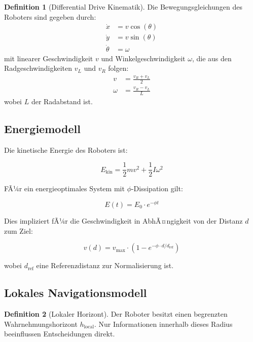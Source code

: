﻿\documentclass[a4paper,12pt]{article}
\theoremstyle{definition}
\newtheorem{definition}{Definition}
\begin{document}
\begin{definition}[Differential Drive Kinematik]
	Die Bewegungsgleichungen des Roboters sind gegeben durch:
	\begin{align}
		\dot{x} &= v \cos(\theta) \\
		\dot{y} &= v \sin(\theta) \\
		\dot{\theta} &= \omega
	\end{align}
	mit linearer Geschwindigkeit $v$ und Winkelgeschwindigkeit $\omega$, die aus den Radgeschwindigkeiten $v_L$ und $v_R$ folgen:
	\begin{align}
		v &= \frac{v_R + v_L}{2} \\
		\omega &= \frac{v_R - v_L}{L}
	\end{align}
	wobei $L$ der Radabstand ist.
\end{definition}

\subsection{Energiemodell}

Die kinetische Energie des Roboters ist:

\begin{equation}
E_{\text{kin}} = \frac{1}{2}m v^2 + \frac{1}{2}I \omega^2
\end{equation}

FÃ¼r ein energieoptimales System mit $\phi$-Dissipation gilt:

\begin{equation}
E(t) = E_0 \cdot e^{-\phi t}
\end{equation}

Dies impliziert fÃ¼r die Geschwindigkeit in AbhÃ¤ngigkeit von der Distanz $d$ zum Ziel:

\begin{equation}\label{eq:phi_speed}
v(d) = v_{\max} \cdot \left(1 - e^{-\phi \cdot d / d_{\text{ref}}}\right)
\end{equation}

wobei $d_{\text{ref}}$ eine Referenzdistanz zur Normalisierung ist.

\subsection{Lokales Navigationsmodell}

\begin{definition}[Lokaler Horizont]
	Der Roboter besitzt einen begrenzten Wahrnehmungshorizont $h_{\text{local}}$. Nur Informationen innerhalb dieses Radius beeinflussen Entscheidungen direkt.
\end{definition}
\end{document}
